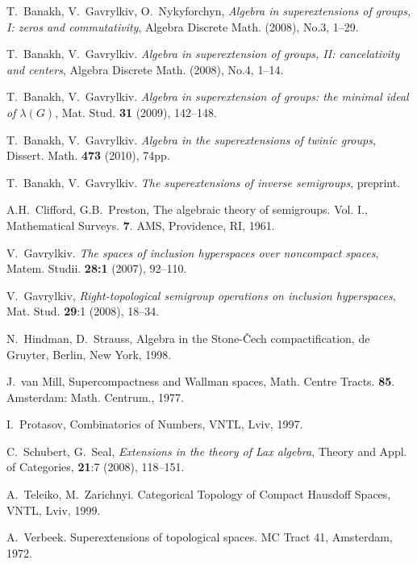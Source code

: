 \documentclass{amsart}
\theoremstyle{definition}
\begin{document}
\begin{thebibliography}{10}

 T.~Banakh, V.~Gavrylkiv, O.~Nykyforchyn, {\em Algebra
in superextensions of groups, I: zeros and commutativity},
Algebra Discrete Math. (2008), No.3, 1--29.

 T.~Banakh, V.~Gavrylkiv. {\em Algebra in superextension of groups, II:
cancelativity and centers}, Algebra Discrete Math. (2008), No.4, 1--14.

 T.~Banakh, V.~Gavrylkiv. {\em Algebra in superextension of groups: the minimal ideal of $\lambda(G)$}, Mat. Stud. {\bf 31} (2009), 142--148.

 T.~Banakh, V.~Gavrylkiv. {\em Algebra in the superextensions of twinic groups}, Dissert. Math. {\bf 473} (2010), 74pp.

 T.~Banakh, V.~Gavrylkiv. {\em The superextensions of inverse semigroups}, preprint.

 A.H.~Clifford, G.B.~Preston, { The algebraic theory of semigroups}. Vol. I., Mathematical
Surveys. {\bf 7}. AMS, Providence, RI, 1961.

 V.~Gavrylkiv. {\em The spaces of inclusion hyperspaces over noncompact
spaces}, Matem. Studii. {\bf 28:1} (2007), 92--110.

 V.~Gavrylkiv, {\em Right-topological semigroup operations on inclusion hyperspaces},
Mat. Stud. {\bf 29}:1 (2008), 18--34.

 N.~Hindman, D.~Strauss, {Algebra in the Stone-\v Cech compactification}, de Gruyter, Berlin, New York, 1998.

 J.~van Mill,
Supercompactness and Wallman spaces, Math. Centre Tracts. {\bf
85}. Amsterdam: Math. Centrum., 1977.

 I.~Protasov, Combinatorics of Numbers, VNTL, Lviv, 1997.

 C.~Schubert, G.~Seal, {\em Extensions in the theory of Lax algebra}, Theory and Appl. of Categories, {\bf 21}:7 (2008), 118--151.

 A.~Teleiko, M.~Zarichnyi. Categorical Topology of
Compact Hausdoff Spaces, VNTL, Lviv, 1999.

 A.~Verbeek. Superextensions of topological spaces. MC
Tract 41, Amsterdam, 1972.

\end{thebibliography}
\end{document}
